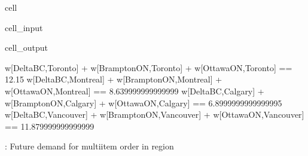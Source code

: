 \documentclass[letterpaper,10pt,english]{jupyterBook}
\begin{document}
\begin{sphinxuseclass}{cell}\begin{sphinxVerbatimInput}

\begin{sphinxuseclass}{cell_input}
\begin{sphinxVerbatim}[commandchars=\\\{\}]

   
    \PYG{p}{[}\PYG{p}{]}      \PYG{p}{[}\PYG{p}{]}\PYG{p}{[}\PYG{p}{]}
    
\end{sphinxVerbatim}

\end{sphinxuseclass}\end{sphinxVerbatimInput}
\begin{sphinxVerbatimOutput}

\begin{sphinxuseclass}{cell_output}
\begin{sphinxVerbatim}[commandchars=\\\{\}]
w[Delta\PYGZhy{}BC,Toronto] + w[Brampton\PYGZhy{}ON,Toronto] + w[Ottawa\PYGZhy{}ON,Toronto]  ==  12.15
w[Delta\PYGZhy{}BC,Montreal] + w[Brampton\PYGZhy{}ON,Montreal] + w[Ottawa\PYGZhy{}ON,Montreal]  ==  8.639999999999999
w[Delta\PYGZhy{}BC,Calgary] + w[Brampton\PYGZhy{}ON,Calgary] + w[Ottawa\PYGZhy{}ON,Calgary]  ==  6.8999999999999995
w[Delta\PYGZhy{}BC,Vancouver] + w[Brampton\PYGZhy{}ON,Vancouver] + w[Ottawa\PYGZhy{}ON,Vancouver]  ==  11.879999999999999
\end{sphinxVerbatim}

\end{sphinxuseclass}\end{sphinxVerbatimOutput}

\end{sphinxuseclass}
\sphinxAtStartPar
{}: Future demand for multi\sphinxhyphen{}item order in region 
\end{document}
